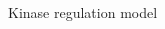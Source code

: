\begin{frame}{Kinase regulation model}
\begin{columns}
\begin{column}{0.5\textwidth}
\begin{figure}
\begin{minipage}[c]{0.37\textwidth}
\end{minipage}
\label{fig:kinase_cascade}
\end{figure}
\end{column}
\end{columns}
\end{frame}


